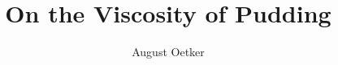 \title{On the Viscosity of Pudding}
\author{August Oetker}


\publishers{Springer Spektrum}
\uppertitleback{This is the \texttt{uppertitleback},\\
  usually used for author information.}
\lowertitleback{This is the \texttt{lowertitleback}.\\
  It usually contains ISBN, ISSN, and other publisher information.}

\dedication{To Franz X. Gabelsberger, inventor of the street named after him.}
